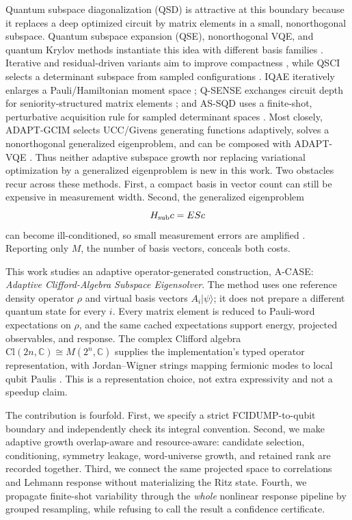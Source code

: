 \documentclass[aps,pra,reprint,superscriptaddress,nofootinbib,floatfix]{revtex4-2}
\newcommand{\Cl}{\mathrm{Cl}}
\newcommand{\ket}[1]{\lvert #1\rangle}
\begin{document}
Quantum subspace diagonalization (QSD) is attractive at this boundary because
it replaces a deep optimized circuit by matrix elements in a small,
nonorthogonal subspace.  Quantum subspace expansion (QSE), nonorthogonal VQE,
and quantum Krylov methods instantiate this idea with different basis
families \cite{mcclean2017qse,huggins2020nonorthogonal,stair2020krylov}.
Iterative and residual-driven variants aim to improve compactness
\cite{tkachenko2024davidson,oleary2025partitioned}, while QSCI selects a
determinant subspace from sampled configurations
\cite{nakagawa2024adaptqsci}.  IQAE iteratively enlarges a Pauli/Hamiltonian
moment space \cite{bharti2021iqae}; Q-SENSE exchanges circuit depth for
seniority-structured matrix elements \cite{patel2026qsense}; and AS-SQD uses a
finite-shot, perturbative acquisition rule for sampled determinant spaces
\cite{miura2026assqd}.  Most closely, ADAPT-GCIM selects UCC/Givens generating
functions adaptively, solves a nonorthogonal generalized eigenproblem, and can
be composed with ADAPT-VQE \cite{zheng2024adaptgcim}.  Thus neither adaptive
subspace growth nor replacing variational optimization by a generalized
eigenproblem is new in this work.  Two obstacles recur across these methods.
First, a compact basis in vector count can still be expensive in measurement
width.  Second, the generalized eigenproblem
\begin{equation}
    H_{\rm sub}c = E S c
    \label{eq:gep-intro}
\end{equation}
can become ill-conditioned, so small measurement errors are amplified
\cite{epperly2022theory,lee2024sampling,zhang2024measurement}.  Reporting only
$M$, the number of basis vectors, conceals both costs.

This work studies an adaptive operator-generated construction, A-CASE:
\emph{Adaptive Clifford-Algebra Subspace Eigensolver}.  The method uses one
reference density operator $\rho$ and virtual basis vectors
$A_i\ket{\psi}$; it does not prepare a different quantum state for every
$i$.  Every matrix element is reduced to Pauli-word expectations on $\rho$,
and the same cached expectations support energy, projected observables, and
response.  The complex Clifford algebra
$\Cl(2n,\mathbb C)\cong M(2^n,\mathbb C)$ supplies the implementation's typed
operator representation, with Jordan--Wigner strings mapping fermionic modes
to local qubit Paulis \cite{utama2026operatorcentric}.  This is a
representation choice, not extra expressivity and not a speedup claim.

The contribution is fourfold.  First, we specify a strict FCIDUMP-to-qubit
boundary and independently check its integral convention.  Second, we make
adaptive growth overlap-aware and resource-aware: candidate selection,
conditioning, symmetry leakage, word-universe growth, and retained rank are
recorded together.  Third, we connect the same projected space to
correlations and Lehmann response without materializing the Ritz state.
Fourth, we propagate finite-shot variability through the \emph{whole}
nonlinear response pipeline by grouped resampling, while refusing to call the
result a confidence certificate.
\end{document}
